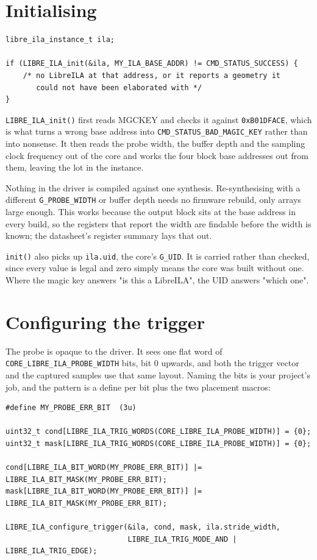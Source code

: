 \documentclass[../manual.tex]{subfiles}
\begin{document}
\section{Initialising}
\label{sec:c_init}

\begin{lstlisting}
libre_ila_instance_t ila;

if (LIBRE_ILA_init(&ila, MY_ILA_BASE_ADDR) != CMD_STATUS_SUCCESS) {
    /* no LibreILA at that address, or it reports a geometry it
       could not have been elaborated with */
}
\end{lstlisting}

\texttt{LIBRE\_ILA\_init()} first reads MGCKEY and checks it against \texttt{0xB01DFACE}, which is what turns a wrong base address into \texttt{CMD\_STATUS\_BAD\_MAGIC\_KEY} rather than into nonsense. It then reads the probe width, the buffer depth and the sampling clock frequency out of the core and works the four block base addresses out from them, leaving the lot in the instance.

Nothing in the driver is compiled against one synthesis. Re-synthesising with a different \texttt{G\_PROBE\_WIDTH} or buffer depth needs no firmware rebuild, only arrays large enough. This works because the output block sits at the base address in every build, so the registers that report the width are findable before the width is known; the datasheet's register summary lays that out.

\texttt{init()} also picks up \texttt{ila.uid}, the core's \texttt{G\_UID}. It is carried rather than checked, since every value is legal and zero simply means the core was built without one. Where the magic key answers "is this a LibreILA", the UID answers "which one".

\section{Configuring the trigger}
\label{sec:c_trigger}

The probe is opaque to the driver. It sees one flat word of \texttt{CORE\_LIBRE\_ILA\_PROBE\_WIDTH} bits, bit 0 upwards, and both the trigger vector and the captured samples use that same layout. Naming the bits is your project's job, and the pattern is a define per bit plus the two placement macros:

\begin{lstlisting}
#define MY_PROBE_ERR_BIT  (3u)

uint32_t cond[LIBRE_ILA_TRIG_WORDS(CORE_LIBRE_ILA_PROBE_WIDTH)] = {0};
uint32_t mask[LIBRE_ILA_TRIG_WORDS(CORE_LIBRE_ILA_PROBE_WIDTH)] = {0};

cond[LIBRE_ILA_BIT_WORD(MY_PROBE_ERR_BIT)] |= LIBRE_ILA_BIT_MASK(MY_PROBE_ERR_BIT);
mask[LIBRE_ILA_BIT_WORD(MY_PROBE_ERR_BIT)] |= LIBRE_ILA_BIT_MASK(MY_PROBE_ERR_BIT);

LIBRE_ILA_configure_trigger(&ila, cond, mask, ila.stride_width,
                            LIBRE_ILA_TRIG_MODE_AND | LIBRE_ILA_TRIG_EDGE);
\end{lstlisting}
\end{document}

